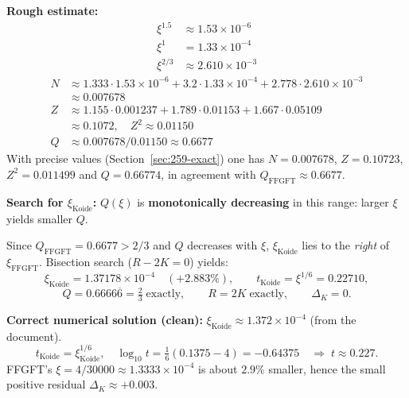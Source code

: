 \textbf{Rough estimate:}
\begin{align*}
  \xi^{1.5} &\approx 1.53\times10^{-6} \\
  \xi^1 &= 1.33\times10^{-4} \\
  \xi^{2/3} &\approx 2.610\times10^{-3}
\end{align*}
\begin{align*}
  N &\approx 1.333\cdot1.53\times10^{-6}+3.2\cdot1.33\times10^{-4}
    +2.778\cdot2.610\times10^{-3} \\
    &\approx 0.007678 \\
  Z &\approx 1.155\cdot0.001237+1.789\cdot0.01153+1.667\cdot0.05109 \\
    &\approx 0.1072, \quad Z^2\approx0.01150 \\
  Q &\approx 0.007678/0.01150 \approx 0.6677
\end{align*}
With precise values (Section~\ref{sec:259-exact}) one has $N=0.007678$,
$Z=0.10723$, $Z^2=0.011499$ and $Q=0.66774$, in agreement with
$Q_{\text{FFGFT}}\approx0.6677$.

\textbf{Search for $\xi_{\text{Koide}}$:}
$Q(\xi)$ is \textbf{monotonically decreasing} in this range:
larger $\xi$ yields smaller $Q$.

\begin{center}
\renewcommand{\arraystretch}{1.3}
\end{center}

Since $Q_{\text{FFGFT}}=0.6677>2/3$ and $Q$ decreases with $\xi$,
$\xi_{\text{Koide}}$ lies to the \emph{right} of $\xi_{\text{FFGFT}}$.
Bisection search ($R-2K=0$) yields:
\[
  \xi_{\text{Koide}} = 1.37178\times10^{-4}
  \quad (+2.883\%),
  \qquad t_{\text{Koide}} = \xi^{1/6} = 0.22710,
\]
\[
  Q = 0.6666\overline{6} = \tfrac{2}{3}\;\text{exactly},
  \qquad R = 2K\;\text{exactly},
  \qquad \Delta_K = 0.
\]

\textbf{Correct numerical solution (clean):}
$\xi_{\text{Koide}}\approx1.372\times10^{-4}$ (from the document).
\[
  t_{\text{Koide}} = \xi_{\text{Koide}}^{1/6}, \quad
  \log_{10}t = \tfrac{1}{6}(0.1375-4) = -0.64375
  \quad\Rightarrow\; t\approx0.227.
\]
FFGFT's $\xi=4/30000\approx1.3333\times10^{-4}$ is about $2.9\%$ smaller,
hence the small positive residual $\Delta_K\approx+0.003$.

